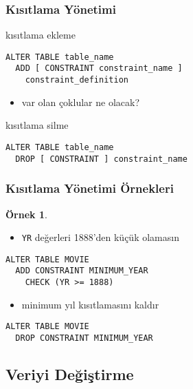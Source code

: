 \documentclass[dvipsnames]{beamer}
\theoremstyle{definition}
\theoremstyle{example}
\newtheorem{ornek}[theorem]{Örnek}
\theoremstyle{plain}
\begin{document}
\begin{frame}[fragile]
  \frametitle{Kısıtlama Yönetimi}

  \begin{block}{kısıtlama ekleme}
    \begin{lstlisting}
ALTER TABLE table_name
  ADD [ CONSTRAINT constraint_name ]
    constraint_definition
    \end{lstlisting}
  \end{block}

  \pause
  \begin{itemize}
    \item var olan çoklular ne olacak?
  \end{itemize}

  \pause
  \begin{block}{kısıtlama silme}
    \begin{lstlisting}
ALTER TABLE table_name
  DROP [ CONSTRAINT ] constraint_name
    \end{lstlisting}
  \end{block}
\end{frame}

\begin{frame}[fragile]
  \frametitle{Kısıtlama Yönetimi Örnekleri}

  \begin{ornek}
    \begin{itemize}
      \item \texttt{YR} değerleri 1888'den küçük olamasın
    \end{itemize}

    \begin{lstlisting}
ALTER TABLE MOVIE
  ADD CONSTRAINT MINIMUM_YEAR
    CHECK (YR >= 1888)
    \end{lstlisting}

    \pause
    \begin{itemize}
      \item minimum yıl kısıtlamasını kaldır
    \end{itemize}

    \begin{lstlisting}
ALTER TABLE MOVIE
  DROP CONSTRAINT MINIMUM_YEAR
    \end{lstlisting}
  \end{ornek}
\end{frame}

\subsection{Veriyi Değiştirme}
\end{document}
